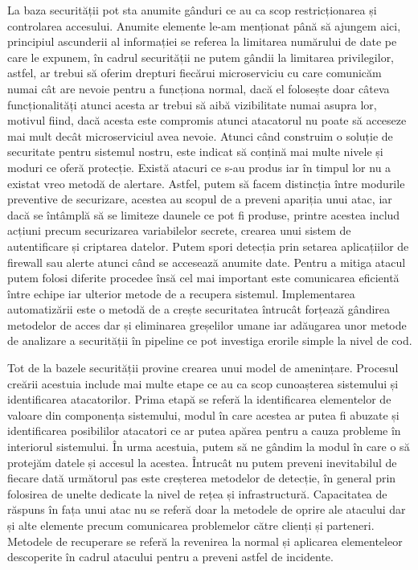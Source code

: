 La baza securității pot sta anumite gânduri ce au ca scop restricționarea și controlarea
accesului. Anumite elemente le-am menționat până să ajungem aici, principiul ascunderii
al informației se referea la limitarea numărului de date pe care le expunem, în cadrul
securității ne putem gândii la limitarea privilegilor, astfel, ar trebui să oferim
drepturi fiecărui microserviciu cu care comunicăm numai cât are nevoie pentru a funcționa normal,
dacă el folosește doar câteva funcționalități atunci acesta ar trebui să aibă vizibilitate
numai asupra lor, motivul fiind, dacă acesta este compromis atunci atacatorul nu poate să
acceseze mai mult decât microserviciul avea nevoie. Atunci când construim o soluție de securitate
pentru sistemul nostru, este indicat să conțină mai multe nivele și moduri ce oferă protecție.
Există atacuri ce s-au produs iar în timpul lor nu a existat vreo metodă de alertare.
Astfel, putem să facem distincția între modurile preventive de securizare, acestea au scopul
de a preveni apariția unui atac, iar dacă se întâmplă să se limiteze daunele ce pot fi produse,
printre acestea includ acțiuni precum securizarea variabilelor secrete, crearea unui sistem
de autentificare și criptarea datelor. Putem spori detecția prin setarea aplicațiilor de firewall
sau alerte atunci când se accesează anumite date. Pentru a mitiga atacul putem folosi
diferite procedee însă cel mai important este comunicarea eficientă între echipe iar ulterior
metode de a recupera sistemul. Implementarea automatizării este o metodă de a crește securitatea
întrucât forțează gândirea metodelor de acces dar și eliminarea greșelilor umane iar
adăugarea unor metode de analizare a securității în pipeline ce pot investiga erorile simple
la nivel de cod.

Tot de la bazele securității provine crearea unui model de amenințare. Procesul creării
acestuia include mai multe etape ce au ca scop cunoașterea sistemului și identificarea atacatorilor.
Prima etapă se referă la identificarea elementelor de valoare din componența sistemului, modul în care
acestea ar putea fi abuzate și identificarea posibililor atacatori ce ar putea apărea pentru a
cauza probleme în interiorul sistemului. În urma acestuia, putem să ne gândim la modul în care
o să protejăm datele și accesul la acestea. Întrucât nu putem preveni inevitabilul
de fiecare dată următorul pas este creșterea metodelor de detecție, în general prin folosirea
de unelte dedicate la nivel de rețea și infrastructură. Capacitatea de răspuns în fața
unui atac nu se referă doar la metodele de oprire ale atacului dar și alte elemente precum
comunicarea problemelor către clienți și parteneri. Metodele de recuperare se referă la
revenirea la normal și aplicarea elementeleor descoperite în cadrul atacului pentru a preveni
astfel de incidente.

